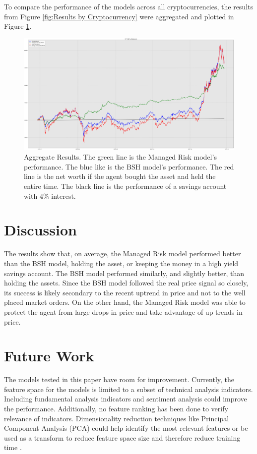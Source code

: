 \documentclass[journal]{new-aiaa}
\begin{document}
To compare the performance of the models across all cryptocurrencies, the results from Figure \ref{fig:Results by Cryptocurrency} were aggregated and plotted in Figure \ref{fig:Aggregate Results}.

\begin{figure}[H]
        \centering
        \includegraphics[width=.8\textwidth]{figures/aggregate_model_results.png}
        \caption{Aggregate Results. The green line is the Managed Risk model's performance. The blue like is the BSH model's performance. The red line is the net worth if the agent bought the asset and held the entire time. The black line is the performance of a savings account with $4\%$ interest.}
        \label{fig:Aggregate Results}
\end{figure}

\section{Discussion}\label{sec:Discussion}
The results show that, on average, the Managed Risk model performed better than the BSH model, holding the asset, or keeping the money in a high yield savings account.
The BSH model performed similarly, and slightly better, than holding the assets.
Since the BSH model followed the real price signal so closely, its success is likely secondary to the recent uptrend in price and not to the well placed market orders.
On the other hand, the Managed Risk model was able to protect the agent from large drops in price and take advantage of up trends in price.

\section{Future Work}\label{sec:Future_Work}
The models tested in this paper have room for improvement.
Currently, the feature space for the models is limited to a subset of technical analysis indicators.
Including fundamental analysis indicators and sentiment analysis could improve the performance.
Additionally, no feature ranking has been done to verify relevance of indicators.
Dimensionality reduction techniques like Principal Component Analysis (PCA) could help identify the most relevant features or be used as a transform to reduce feature space size and therefore reduce training time \cite{hotelling1933analysis}.
\end{document}
